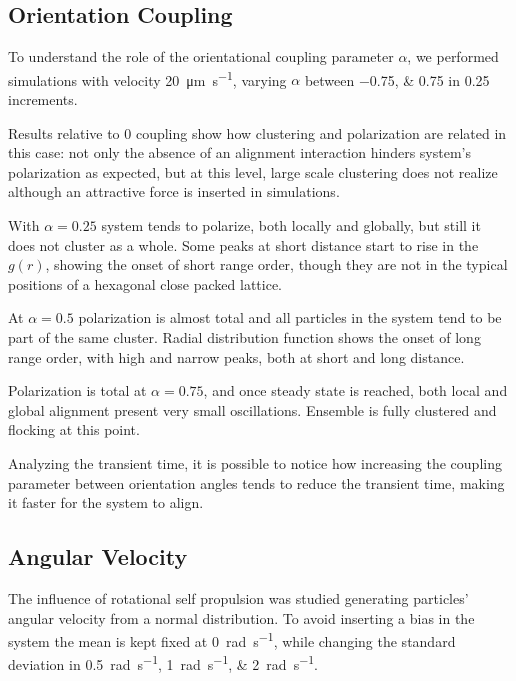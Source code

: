 \documentclass[../../master_thesis_np.tex]{subfiles}
\begin{document}
		\subsection{Orientation Coupling}
		To understand the role of the orientational coupling parameter $\alpha$, we performed simulations with velocity \SI{20}{\um\per\second}, varying $\alpha$ between \numlist{-0.75; 0.75} in \num{0.25} increments. 
		
		Results relative to \num{0} coupling show how clustering and polarization are related in this case: not only the absence of an alignment interaction hinders system's polarization as expected, but at this level, large scale clustering does not realize although an attractive force is inserted in simulations.
		
		With $\alpha = 0.25$ system tends to polarize, both locally and globally, but still it does not cluster as a whole. 
		Some peaks at short distance start to rise in the $g(r)$, showing the onset of short range order, though they are not in the typical positions of a hexagonal close packed lattice.
		
		At $\alpha = 0.5$ polarization is almost total and all particles in the system tend to be part of the same cluster.
		Radial distribution function shows the onset of long range order, with high and narrow peaks, both at short and long distance.
		
		Polarization is total at $\alpha = 0.75$, and once steady state is reached, both local and global alignment present very small oscillations.
		Ensemble is fully clustered and flocking at this point.
		
		Analyzing the transient time, it is possible to notice how increasing the coupling parameter between orientation angles tends to reduce the transient time, making it faster for the system to align.
		
		\subsection{Angular Velocity}
		The influence of rotational self propulsion was studied generating particles' angular velocity from a normal distribution.
		To avoid inserting a bias in the system the mean is kept fixed at \SI{0}{\radian\per\second}, while changing the standard deviation in \qtylist{0.5; 1;2}{\radian\per\second}.
		
\end{document}
